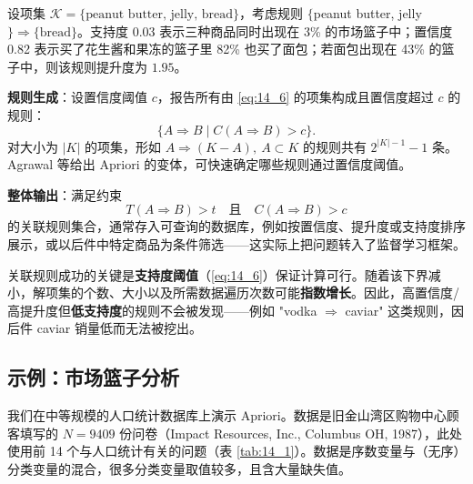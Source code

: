 \begin{example}[花生酱--果冻--面包]
设项集 $\mathcal{K}=\{\text{peanut butter, jelly, bread}\}$，考虑规则 $\{$peanut butter, jelly$\}\Rightarrow\{\text{bread}\}$。支持度 0.03 表示三种商品同时出现在 3\% 的市场篮子中；置信度 0.82 表示买了花生酱和果冻的篮子里 82\% 也买了面包；若面包出现在 43\% 的篮子中，则该规则提升度为 $1.95$。
\end{example}

\textbf{规则生成}：设置信度阈值 $c$，报告所有由 \eqref{eq:14_6} 的项集构成且置信度超过 $c$ 的规则：
\begin{equation}
\{A\Rightarrow B \mid C(A\Rightarrow B) > c\}. \label{eq:14_9}
\end{equation}
对大小为 $|K|$ 的项集，形如 $A\Rightarrow (K-A),\ A\subset K$ 的规则共有 $2^{|K|-1}-1$ 条。Agrawal 等给出 Apriori 的变体，可快速确定哪些规则通过置信度阈值。

\textbf{整体输出}：满足约束
\[
T(A\Rightarrow B)>t \quad\text{且}\quad C(A\Rightarrow B)>c
\]
的关联规则集合，通常存入可查询的数据库，例如按置信度、提升度或支持度排序展示，或以后件中特定商品为条件筛选——这实际上把问题转入了监督学习框架。

\begin{remark}[关联规则的局限]
关联规则成功的关键是\textbf{支持度阈值}（\eqref{eq:14_6}）保证计算可行。随着该下界减小，解项集的个数、大小以及所需数据遍历次数可能\textbf{指数增长}。因此，高置信度/高提升度但\textbf{低支持度}的规则不会被发现——例如 "vodka $\Rightarrow$ caviar" 这类规则，因后件 caviar 销量低而无法被挖出。
\end{remark}

\subsection{示例：市场篮子分析}

我们在中等规模的人口统计数据库上演示 Apriori。数据是旧金山湾区购物中心顾客填写的 $N=9409$ 份问卷（Impact Resources, Inc., Columbus OH, 1987），此处使用前 14 个与人口统计有关的问题（表 \ref{tab:14_1}）。数据是序数变量与（无序）分类变量的混合，很多分类变量取值较多，且含大量缺失值。

